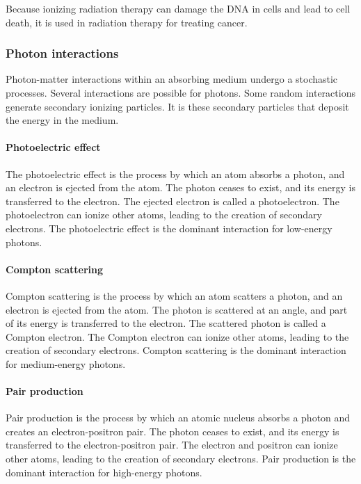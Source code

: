 Because ionizing radiation therapy can damage the DNA in cells and lead to cell death, it is used in radiation therapy for treating cancer.

\subsubsection{Photon interactions}
Photon-matter interactions within an absorbing medium undergo a stochastic processes.
Several interactions are possible for photons.
Some random interactions generate secondary ionizing particles.
It is these secondary particles that deposit the energy in the medium.

\paragraph{Photoelectric effect}
The photoelectric effect is the process by which an atom absorbs a photon, and an electron is ejected from the atom.
The photon ceases to exist, and its energy is transferred to the electron.
The ejected electron is called a photoelectron.
The photoelectron can ionize other atoms, leading to the creation of secondary electrons.
The photoelectric effect is the dominant interaction for low-energy photons.

\paragraph{Compton scattering}
Compton scattering is the process by which an atom scatters a photon, and an electron is ejected from the atom.
The photon is scattered at an angle, and part of its energy is transferred to the electron.
The scattered photon is called a Compton electron.
The Compton electron can ionize other atoms, leading to the creation of secondary electrons.
Compton scattering is the dominant interaction for medium-energy photons.

\paragraph{Pair production}
Pair production is the process by which an atomic nucleus absorbs a photon and creates an electron-positron pair.
The photon ceases to exist, and its energy is transferred to the electron-positron pair.
The electron and positron can ionize other atoms, leading to the creation of secondary electrons.
Pair production is the dominant interaction for high-energy photons.


